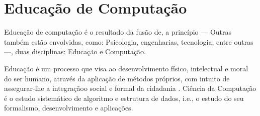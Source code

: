 \documentclass[
	12pt,				%
	openright,			%
	oneside,
	a4paper,			%
	english,			%
	french,				%
	spanish,			%
	brazil,				%
	]{abntex2}
\begin{document}

\section{Educação de Computação}
\label{sec:EC}

Educação de computação é o resultado da fusão de, a princípio --- Outras também estão envolvidas, como: Psicologia, engenharias, tecnologia, entre outras ---, duas disciplinas: Educação e Computação. 

Educação é um processo que visa ao desenvolvimento físico, intelectual e moral do ser humano, através da aplicação de métodos próprios, com intuito de assegurar-lhe a integraçãoo social e formal da cidadania \cite{weiszflog1999michaelis}. Ciência da Computação é o estudo sistemático de algoritmo e estrutura de dados, i.e., o estudo do seu formalismo, desenvolvimento e aplicações. \cite{gibbs1986model}
\end{document}
